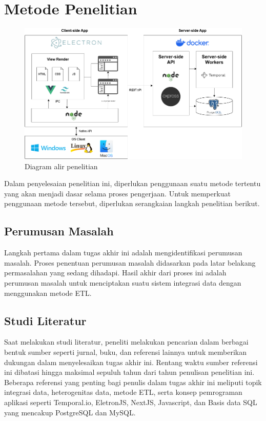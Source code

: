 \section{Metode Penelitian}
\label{sec:arsitektur}



\begin{figure} [ht]
  \centering
  \includegraphics[width=\linewidth]{gambar/Arsitektur.png}

  \caption{Diagram alir penelitian}
  \label{fig:flow}
\end{figure}

Dalam penyelesaian penelitian ini, diperlukan penggunaan suatu metode tertentu yang akan menjadi dasar selama proses pengerjaan. Untuk memperkuat penggunaan metode tersebut, diperlukan serangkaian langkah penelitian berikut.

\subsection{Perumusan Masalah}
Langkah pertama dalam tugas akhir ini adalah mengidentifikasi perumusan masalah. Proses penentuan perumusan masalah didasarkan pada latar belakang permasalahan yang sedang dihadapi. Hasil akhir dari proses ini adalah perumusan masalah untuk menciptakan suatu sistem integrasi data dengan menggunakan metode ETL.

\subsection{Studi Literatur}
Saat melakukan studi literatur, peneliti melakukan pencarian dalam berbagai bentuk sumber seperti jurnal, buku, dan referensi lainnya untuk memberikan dukungan dalam menyelesaikan tugas akhir ini. Rentang waktu sumber referensi ini dibatasi hingga maksimal sepuluh tahun dari tahun penulisan penelitian ini. Beberapa referensi yang penting bagi penulis dalam tugas akhir ini meliputi topik integrasi data, heterogenitas data, metode ETL, serta konsep pemrograman aplikasi seperti Temporal.io, EletronJS, NextJS, Javascript, dan Basis data SQL yang mencakup PostgreSQL dan MySQL.


